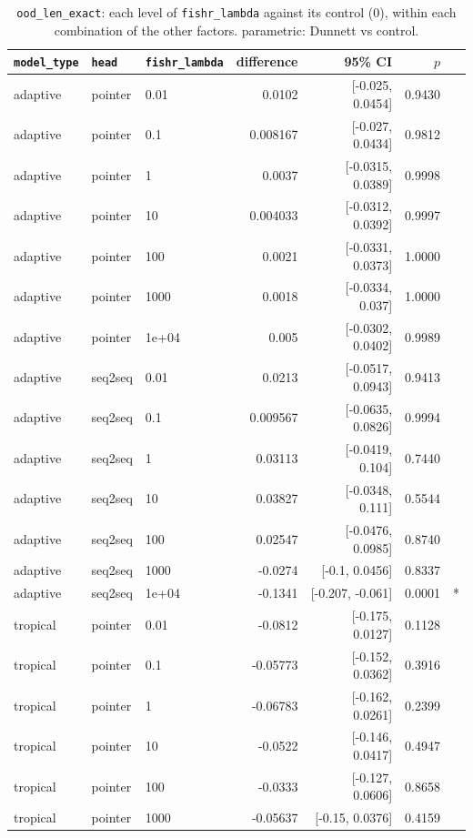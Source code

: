 \documentclass[10pt]{article}
\begin{document}
{\small
\begin{longtable}{lllrrrl}
\caption{\texttt{ood\_len\_exact}: each level of \texttt{fishr\_lambda} against its control (0), within each combination of the other factors. parametric: Dunnett vs control.}\label{tab:control-ood_len_exact}\\
\toprule
\texttt{model\_type} & \texttt{head} & \texttt{fishr\_lambda} & difference & 95\% CI & $p$ & \\
\midrule
\endhead
adaptive & pointer & 0.01 & 0.0102 & [-0.025, 0.0454] & 0.9430 & \\
adaptive & pointer & 0.1 & 0.008167 & [-0.027, 0.0434] & 0.9812 & \\
adaptive & pointer & 1 & 0.0037 & [-0.0315, 0.0389] & 0.9998 & \\
adaptive & pointer & 10 & 0.004033 & [-0.0312, 0.0392] & 0.9997 & \\
adaptive & pointer & 100 & 0.0021 & [-0.0331, 0.0373] & 1.0000 & \\
adaptive & pointer & 1000 & 0.0018 & [-0.0334, 0.037] & 1.0000 & \\
adaptive & pointer & 1e+04 & 0.005 & [-0.0302, 0.0402] & 0.9989 & \\
adaptive & seq2seq & 0.01 & 0.0213 & [-0.0517, 0.0943] & 0.9413 & \\
adaptive & seq2seq & 0.1 & 0.009567 & [-0.0635, 0.0826] & 0.9994 & \\
adaptive & seq2seq & 1 & 0.03113 & [-0.0419, 0.104] & 0.7440 & \\
adaptive & seq2seq & 10 & 0.03827 & [-0.0348, 0.111] & 0.5544 & \\
adaptive & seq2seq & 100 & 0.02547 & [-0.0476, 0.0985] & 0.8740 & \\
adaptive & seq2seq & 1000 & -0.0274 & [-0.1, 0.0456] & 0.8337 & \\
adaptive & seq2seq & 1e+04 & -0.1341 & [-0.207, -0.061] & 0.0001 & *\\
tropical & pointer & 0.01 & -0.0812 & [-0.175, 0.0127] & 0.1128 & \\
tropical & pointer & 0.1 & -0.05773 & [-0.152, 0.0362] & 0.3916 & \\
tropical & pointer & 1 & -0.06783 & [-0.162, 0.0261] & 0.2399 & \\
tropical & pointer & 10 & -0.0522 & [-0.146, 0.0417] & 0.4947 & \\
tropical & pointer & 100 & -0.0333 & [-0.127, 0.0606] & 0.8658 & \\
tropical & pointer & 1000 & -0.05637 & [-0.15, 0.0376] & 0.4159 & \\

\end{longtable}}
\end{document}
